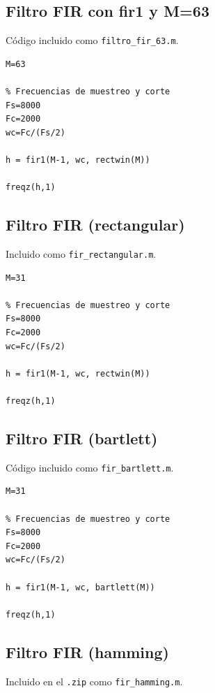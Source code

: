 \documentclass[11pt,a4paper]{article}
\begin{document}
\subsection{Filtro FIR con fir1 y M=63}
\label{code4}

Código incluido como \texttt{filtro\_fir\_63.m}.

\begin{lstlisting}[frame=single]
% Coeficientes del filtro
M=63

% Frecuencias de muestreo y corte
Fs=8000
Fc=2000
wc=Fc/(Fs/2)

h = fir1(M-1, wc, rectwin(M))

freqz(h,1)
\end{lstlisting}

\subsection{Filtro FIR (rectangular)}
\label{code5}

Incluido como \texttt{fir\_rectangular.m}.

\begin{lstlisting}[frame=single]
% Coeficientes del filtro
M=31

% Frecuencias de muestreo y corte
Fs=8000
Fc=2000
wc=Fc/(Fs/2)

h = fir1(M-1, wc, rectwin(M))

freqz(h,1)
\end{lstlisting}

\subsection{Filtro FIR (bartlett)}
\label{code6}

Código incluido como \texttt{fir\_bartlett.m}.

\begin{lstlisting}[frame=single]
% Coeficientes del filtro
M=31

% Frecuencias de muestreo y corte
Fs=8000
Fc=2000
wc=Fc/(Fs/2)

h = fir1(M-1, wc, bartlett(M))

freqz(h,1)
\end{lstlisting}

\subsection{Filtro FIR (hamming)}
\label{code7}

Incluido en el \texttt{.zip} como \texttt{fir\_hamming.m}.
\end{document}
